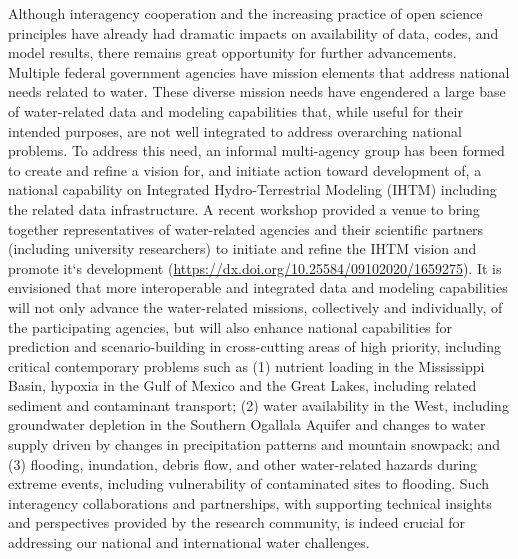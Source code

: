 \documentclass[preprint,review, 12pt]{elsarticle}
\begin{document}
Although interagency cooperation and the increasing practice of open science principles have already had dramatic impacts on availability of data, codes, and model results, there remains great opportunity for further advancements. Multiple federal government agencies have mission elements that address national needs related to water. These diverse mission needs have engendered a large base of water-related data and modeling capabilities that, while useful for their intended purposes, are not well integrated to address overarching national problems. To address this need, an informal multi-agency group has been formed to create and refine a vision for, and initiate action toward development of, a national capability on Integrated Hydro-Terrestrial Modeling (IHTM) including the related data infrastructure. A recent workshop provided a venue to bring together representatives of water-related agencies and their scientific partners (including university researchers) to initiate and refine the IHTM vision and promote it`s development (\url{https://dx.doi.org/10.25584/09102020/1659275}). It is envisioned that more interoperable and integrated data and modeling capabilities will not only advance the water-related missions, collectively and individually, of the participating agencies, but will also enhance national capabilities for prediction and scenario-building in cross-cutting areas of high priority, including critical contemporary problems such as (1) nutrient loading in the Mississippi Basin, hypoxia in the Gulf of Mexico and the Great Lakes, including related sediment and contaminant transport; (2) water availability in the West, including groundwater depletion in the Southern Ogallala Aquifer and changes to water supply driven by changes in precipitation patterns and mountain snowpack; and (3) flooding, inundation, debris flow, and other water-related hazards during extreme events, including vulnerability of contaminated sites to flooding. Such interagency collaborations and partnerships, with supporting technical insights and perspectives provided by the research community, is indeed crucial for addressing our national and international water challenges. 
 
\end{document}
